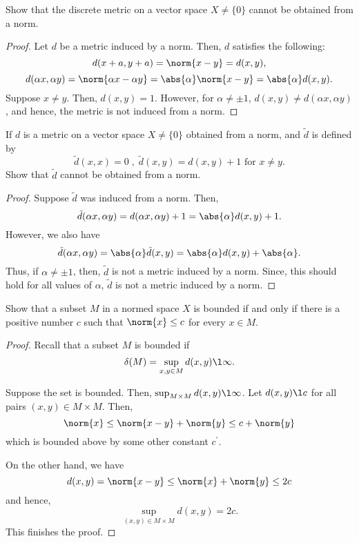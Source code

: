 \begin{question}
    Show that the discrete metric on a vector space $X \neq \{0\}$ cannot be obtained from a norm.
    \label{section2.2-13}
\end{question}
\begin{proof}
    Let $d$ be a metric induced by a norm. Then, $d$ satisfies the following:
    \[d(x+a, y+a) = \norm{x-y} = d(x,y), \]
    \[d(\alpha x , \alpha y) = \norm{\alpha x - \alpha y} = \abs{\alpha} \norm{x - y} = \abs{\alpha} d(x,y).\]
    Suppose $x \neq y$. Then, $d(x,y) = 1$. However, for $\alpha \neq \pm 1$, $d(x,y) \neq d(\alpha x , \alpha y)$, and hence, the metric is not induced from a norm.
\end{proof}

\begin{question}
    If $d$ is a metric on a vector space $X \neq \{0\}$ obtained from a norm, and $\tilde{d}$ is defined by
    \[\tilde{d}(x,x) = 0 \;,\; \tilde{d}(x,y) = d(x,y) + 1 \text{ for } x\neq y.\]
    Show that $\tilde{d}$ cannot be obtained from a norm.
    \label{section2.2-14}
\end{question}

\begin{proof}
    Suppose $\tilde{d}$ was induced from a norm. Then, 
    \[\tilde{d}(\alpha x , \alpha y) = d(\alpha x , \alpha y) + 1 = \abs{\alpha} d(x , y) + 1.\]
    However, we also have
    \[\tilde{d}(\alpha x , \alpha y) = \abs{\alpha} \tilde{d}(x , y) = \abs{\alpha} d(x,y) + \abs{\alpha}.\]
    Thus, if $\alpha \neq \pm 1$, then, $\tilde{d}$ is not a metric induced by a norm. Since, this should hold for all values of $\alpha$, $\tilde{d}$ is not a metric induced by a norm.
\end{proof}

\begin{question}
    Show that a subset $M$ in a normed space $X$ is bounded if and only if there is a positive number $c$ such that $\norm{x} \leq c$ for every $x \in M$.
    \label{section2.2-15}
\end{question}
\begin{proof}
    Recall that a subset $M$ is bounded if 
    \[\delta(M) = \sup_{x , y \in M} d(x,y) \l \infty.\]

    Suppose the set is bounded. Then, $\sup_{M \times M} d(x,y) \l \infty$. Let $d(x,y) \l c$ for all pairs $(x,y) \in M\times M$. Then, 
    \[\norm{x} \leq \norm{x-y} + \norm{y} \leq c + \norm{y}\]
    which is bounded above by some other constant $c^\prime.$

    On the other hand, we have
    \[d(x,y) = \norm{x-y} \leq \norm{x} + \norm{y} \leq 2c\]
    and hence, 
    \[\sup_{(x,y) \in M\times M} d(x,y) = 2c.\]
    This finishes the proof.
\end{proof}